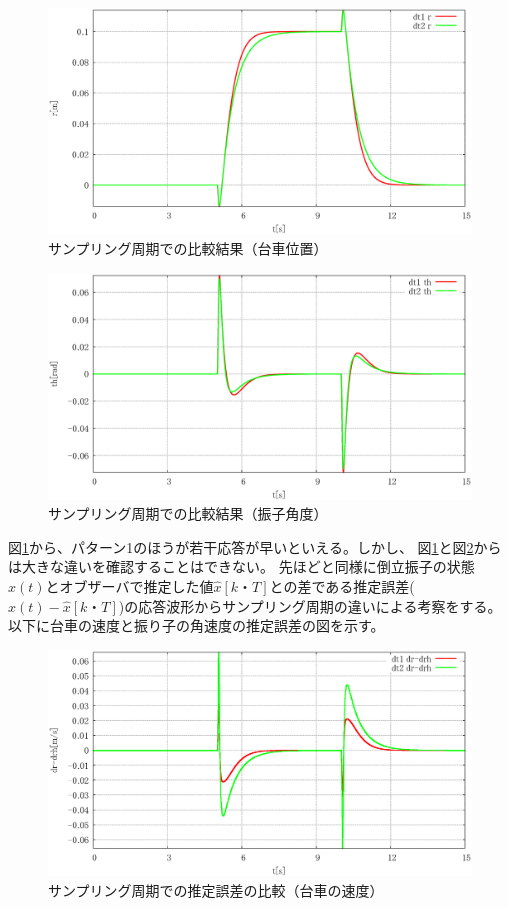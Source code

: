 	\begin{figure}[H]
		\centering
		\includegraphics[width=0.8\linewidth]{gazo/simulation_dt_compare_R.eps}
		\caption{サンプリング周期での比較結果（台車位置）}
		\label{image:simulation_dt_r}
	\end{figure}
	\begin{figure}[H]
		\centering
		\includegraphics[width=0.8\linewidth]{gazo/simulation_dt_compare_THETA.eps}
		\caption{サンプリング周期での比較結果（振子角度）}
		\label{image:simulation_dt_theta}
	\end{figure}
	図\ref{image:simulation_dt_r}から、パターン1のほうが若干応答が早いといえる。しかし、
	図\ref{image:simulation_dt_r}と図\ref{image:simulation_dt_theta}からは大きな違いを確認することはできない。
	先ほどと同様に倒立振子の状態$x(t)$とオブザーバで推定した値$\hat{x}[k・T]$との差である推定誤差($x(t)-\hat{x}[k・T]$)の応答波形からサンプリング周期の違いによる考察をする。
	以下に台車の速度と振り子の角速度の推定誤差の図を示す。
	\begin{figure}[H]
		\centering
		\includegraphics[width=0.8\linewidth]{gazo/simulation_dt_compare_RminusRH.eps}
		\caption{サンプリング周期での推定誤差の比較（台車の速度）}
		\label{image:simulation_dt_rminusrh}
	\end{figure}

